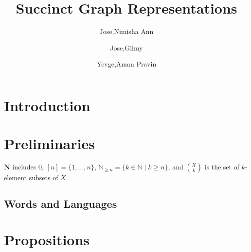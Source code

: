 \documentclass[runningheads]{llncs}
\begin{document}
%
\title{Succinct Graph Representations}
%
%
\author{Jose,Nimisha Ann  \and
Jose,Gilmy\and
Yevge,Aman Pravin}
%
%
%
\maketitle              %
%

%
%
%
\section{Introduction}
\section{Preliminaries}
\label{sec:preliminaries}

$\mathbf{N}$ includes $0$,
$[n] = \{1, \dots, n\}$, $\mathbb{N}_{\ge n} = \{ k \in \mathbb{N} \mid k \ge n \}$, and
$\binom{X}{k}$ is the set of $k$-element subsets of $X$.

\subsection{Words and Languages}


\section{Propositions}
\end{document}

